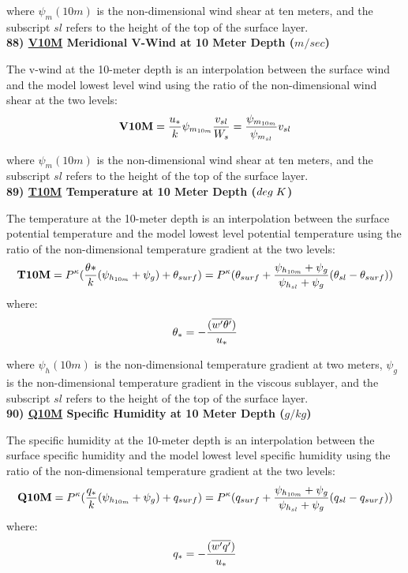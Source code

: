 \noindent
where $\psi_m(10m)$ is the non-dimensional wind shear at ten meters, and the subscript
$sl$ refers to the height of the top of the surface layer.
\\
 
\noindent
{\bf 88)  \underline {V10M}  Meridional V-Wind at 10 Meter Depth ($m/sec$) }

\noindent
The v-wind at the 10-meter depth is an interpolation between the surface wind
and the model lowest level wind using the ratio of the non-dimensional wind shear
at the two levels:
\[
{\bf V10M} = {u_* \over k} \psi_{m_{10m}} {v_{sl} \over {W_s}} =
{ \psi_{m_{10m}} \over {\psi_{m_{sl}} }}v_{sl}
\]

\noindent
where $\psi_m(10m)$ is the non-dimensional wind shear at ten meters, and the subscript
$sl$ refers to the height of the top of the surface layer.
\\
 
\noindent
{\bf 89)  \underline {T10M}  Temperature at 10 Meter Depth ($deg \hspace{.1cm} K$) }

\noindent
The temperature at the 10-meter depth is an interpolation between the surface potential 
temperature and the model lowest level potential temperature using the ratio of the 
non-dimensional temperature gradient at the two levels:
\[
{\bf T10M} = P^{\kappa} ({\theta* \over k} ({\psi_{h_{10m}}+\psi_g}) + \theta_{surf} ) = 
P^{\kappa}(\theta_{surf} + { {\psi_{h_{10m}}+\psi_g} \over {{\psi_{h_{sl}}+\psi_g}} }
(\theta_{sl} - \theta_{surf})) 
\]
where:
\[
\theta_* = - { (\overline{w^{\prime}\theta^{\prime}}) \over {u_*} }
\]

\noindent
where $\psi_h(10m)$ is the non-dimensional temperature gradient at two meters, $\psi_g$ is
the non-dimensional temperature gradient in the viscous sublayer, and the subscript
$sl$ refers to the height of the top of the surface layer.
\\
 
\noindent
{\bf 90)  \underline {Q10M}  Specific Humidity at 10 Meter Depth ($g/kg$) }

\noindent
The specific humidity at the 10-meter depth is an interpolation between the surface specific 
humidity and the model lowest level specific humidity using the ratio of the 
non-dimensional temperature gradient at the two levels:
\[
{\bf Q10M} = P^{\kappa} ({q_* \over k} ({\psi_{h_{10m}}+\psi_g}) + q_{surf} ) = 
P^{\kappa}(q_{surf} + { {\psi_{h_{10m}}+\psi_g} \over {{\psi_{h_{sl}}+\psi_g}} }
(q_{sl} - q_{surf})) 
\]
where:
\[
q_* =  - { (\overline{w^{\prime}q^{\prime}}) \over {u_*} }
\]

